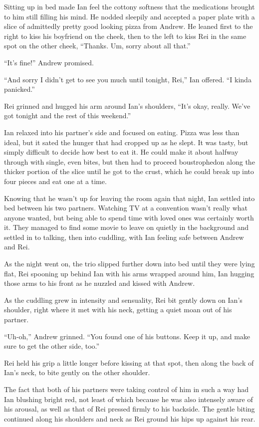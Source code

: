 Sitting up in bed made Ian feel the cottony softness that the medications brought to him still filling his mind. He nodded sleepily and accepted a paper plate with a slice of admittedly pretty good looking pizza from Andrew. He leaned first to the right to kiss his boyfriend on the cheek, then to the left to kiss Rei in the same spot on the other cheek, ``Thanks. Um, sorry about all that.''

``It's fine!'' Andrew promised.

``And sorry I didn't get to see you much until tonight, Rei,'' Ian offered. ``I kinda panicked.''

Rei grinned and hugged his arm around Ian's shoulders, ``It's okay, really. We've got tonight and the rest of this weekend.''

Ian relaxed into his partner's side and focused on eating. Pizza was less than ideal, but it sated the hunger that had cropped up as he slept. It was tasty, but simply difficult to decide how best to eat it. He could make it about halfway through with single, even bites, but then had to proceed boustrophedon along the thicker portion of the slice until he got to the crust, which he could break up into four pieces and eat one at a time.

Knowing that he wasn't up for leaving the room again that night, Ian settled into bed between his two partners. Watching TV at a convention wasn't really what anyone wanted, but being able to spend time with loved ones was certainly worth it. They managed to find some movie to leave on quietly in the background and settled in to talking, then into cuddling, with Ian feeling safe between Andrew and Rei.

As the night went on, the trio slipped further down into bed until they were lying flat, Rei spooning up behind Ian with his arms wrapped around him, Ian hugging those arms to his front as he nuzzled and kissed with Andrew.

As the cuddling grew in intensity and sensuality, Rei bit gently down on Ian's shoulder, right where it met with his neck, getting a quiet moan out of his partner.

``Uh-oh,'' Andrew grinned. ``You found one of his buttons. Keep it up, and make sure to get the other side, too.''

Rei held his grip a little longer before kissing at that spot, then along the back of Ian's neck, to bite gently on the other shoulder.

The fact that both of his partners were taking control of him in such a way had Ian blushing bright red, not least of which because he was also intensely aware of his arousal, as well as that of Rei pressed firmly to his backside. The gentle biting continued along his shoulders and neck as Rei ground his hips up against his rear.

